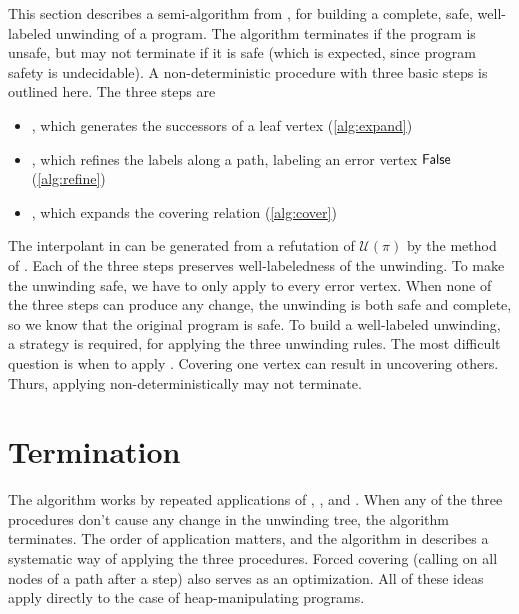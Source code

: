 \label{ch:impact-algorithm}
%

This section describes a semi-algorithm from \cite{mcmillan06}, for building a complete, safe, well-labeled unwinding of a program. The algorithm terminates if the program is unsafe, but may not terminate if it is safe (which is expected, since program safety is undecidable). A non-deterministic procedure with three basic steps is outlined here. The three steps are

\begin{itemize}
  \item \expand, which generates the successors of a leaf vertex (\autoref{alg:expand})
  \item {}, which refines the labels along a path, labeling an error vertex $\mathsf{False}$ (\autoref{alg:refine})
  \item \cover, which expands the covering relation (\autoref{alg:cover})
\end{itemize}

The interpolant in  can be generated from a refutation of $\mathcal{U}(\pi)$ by the method of \cite{mcmillan05}. Each of the three steps preserves well-labeledness of the unwinding. To make the unwinding safe, we have to only apply  to every error vertex. When none of the three steps can produce any change, the unwinding is both safe and complete, so we know that the original program is safe.
To build a well-labeled unwinding, a strategy is required, for applying the three unwinding rules. The most difficult question is when to apply \cover. Covering one vertex can result in uncovering others. Thurs, applying \cover non-deterministically may not terminate.

\section{Termination}
The \impact algorithm works by repeated applications of \expand, \cover, and . When any of the three procedures don't cause any change in the unwinding tree, the algorithm terminates. The order of application matters, and the \unwind algorithm in \cite{mcmillan06} describes a systematic way of applying the three procedures. Forced covering (calling \cover on all nodes of a path after a  step) also serves as an optimization. All of these ideas apply directly to the case of heap-manipulating programs.

